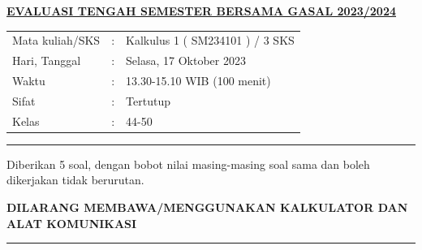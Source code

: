 \documentclass[10pt,openany,a4paper]{article}
\renewcommand{\headrulewidth}{0pt}
\begin{document}
    \newpage
    \fancyhead{}
    \fancyhead[r]{}
    \renewcommand{\headrulewidth}{0pt}
    
    \begin{center}
	{\underline{\textbf{\MakeUppercase{Evaluasi Tengah Semester Bersama Gasal 2023/2024}}}}
    \end{center}

    \begin{center}
	\begin{tabular}{lcl}
		Mata kuliah/SKS & : & Kalkulus 1 ( SM234101 ) / 3 SKS\\
		Hari, Tanggal & : & Selasa, 17 Oktober 2023\\
		Waktu & : & 13.30-15.10 WIB (100 menit)\\
		Sifat & : & Tertutup\\
		Kelas & : & 44-50
	\end{tabular}
    \end{center}
	
    \noindent\rule{\textwidth}{2.pt}
	
    \setlength{\parindent}{5pt}
    \par Diberikan 5 soal, dengan bobot nilai masing-masing soal sama dan boleh dikerjakan tidak berurutan.
    \setlength{\parindent}{5pt}
    \setlength{\parindent}{5pt}
    {\small
    \par \textbf{\MakeUppercase{Dilarang membawa/menggunakan kalkulator dan alat komunikasi}}
    }
    \par {}
	
    \noindent\rule{\textwidth}{2.pt}
	
\end{document}
